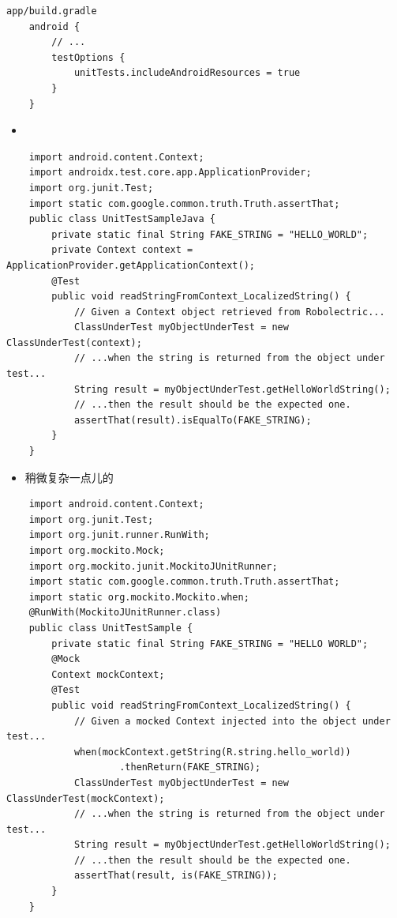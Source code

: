 \documentclass[9pt, b5paper]{article}
\begin{document}
\begin{verbatim}
app/build.gradle
    android {
        // ...
        testOptions {
            unitTests.includeAndroidResources = true
        }
    }
\end{verbatim}
\begin{itemize}
\item 
\end{itemize}
\begin{verbatim}
    import android.content.Context;
    import androidx.test.core.app.ApplicationProvider;
    import org.junit.Test;
    import static com.google.common.truth.Truth.assertThat;
    public class UnitTestSampleJava {
        private static final String FAKE_STRING = "HELLO_WORLD";
        private Context context = ApplicationProvider.getApplicationContext();
        @Test
        public void readStringFromContext_LocalizedString() {
            // Given a Context object retrieved from Robolectric...
            ClassUnderTest myObjectUnderTest = new ClassUnderTest(context);
            // ...when the string is returned from the object under test...
            String result = myObjectUnderTest.getHelloWorldString();
            // ...then the result should be the expected one.
            assertThat(result).isEqualTo(FAKE_STRING);
        }
    }
\end{verbatim}
\begin{itemize}
\item 稍微复杂一点儿的
\end{itemize}
\begin{verbatim}
    import android.content.Context;
    import org.junit.Test;
    import org.junit.runner.RunWith;
    import org.mockito.Mock;
    import org.mockito.junit.MockitoJUnitRunner;
    import static com.google.common.truth.Truth.assertThat;
    import static org.mockito.Mockito.when;
    @RunWith(MockitoJUnitRunner.class)
    public class UnitTestSample {
        private static final String FAKE_STRING = "HELLO WORLD";
        @Mock
        Context mockContext;
        @Test
        public void readStringFromContext_LocalizedString() {
            // Given a mocked Context injected into the object under test...
            when(mockContext.getString(R.string.hello_world))
                    .thenReturn(FAKE_STRING);
            ClassUnderTest myObjectUnderTest = new ClassUnderTest(mockContext);
            // ...when the string is returned from the object under test...
            String result = myObjectUnderTest.getHelloWorldString();
            // ...then the result should be the expected one.
            assertThat(result, is(FAKE_STRING));
        }
    }
\end{verbatim}
\end{document}
